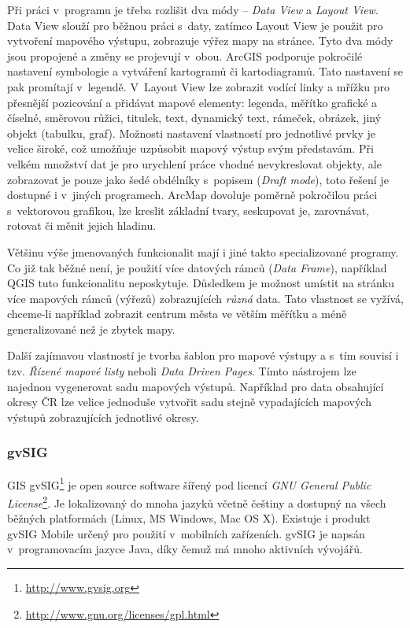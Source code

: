 \documentclass[a4paper,12pt,draft]{article}
\begin{document}
Při práci v~programu je třeba rozlišit dva módy -- \emph{Data View}
a \emph{Layout View}. Data View slouží pro běžnou práci s~daty,
zatímco Layout View je použit pro vytvoření mapového výstupu,
zobrazuje výřez mapy na stránce. Tyto dva módy jsou propojené a
změny se projevují v~obou. ArcGIS podporuje pokročilé nastavení
symbologie a vytváření kartogramů či kartodiagramů. Tato nastavení se
pak promítají v~legendě. V~Layout View lze zobrazit vodící linky a
mřížku pro přesnější pozicování  a  přidávat mapové elementy:
legenda, měřítko grafické a číselné, směrovou růžici, titulek,
text, dynamický text, rámeček, obrázek, jiný objekt (tabulku, graf).
Možnosti nastavení vlastností pro jednotlivé prvky je velice široké,
což umožňuje uzpůsobit mapový výstup svým představám. Při velkém
množství dat je pro urychlení práce vhodné nevykreslovat objekty, ale
zobrazovat je pouze jako šedé obdélníky s~popisem (\emph{Draft mode}),
toto řešení je dostupné i v~jiných programech. ArcMap dovoluje poměrně
pokročilou práci s~vektorovou grafikou, lze kreslit základní tvary,
seskupovat je, zarovnávat, rotovat či měnit jejich hladinu.

Většinu výše jmenovaných funkcionalit mají i jiné takto
specializované programy. Co již tak běžné není, je použití více
datových rámců (\emph{Data Frame}), například QGIS tuto funkcionalitu
neposkytuje. Důsledkem je možnost umístit na stránku více mapových
rámců (výřezů) zobrazujících \emph{různá} data. Tato vlastnost
se vyžívá, chceme-li například zobrazit centrum města ve větším
měřítku a méně generalizované než je zbytek mapy.

Další zajímavou vlastností je tvorba šablon pro mapové výstupy a
s~tím souvisí i tzv. \emph{Řízené mapové listy} neboli \emph{Data
Driven Pages}. Tímto nástrojem lze najednou vygenerovat sadu mapových
výstupů. Například pro data obsahující okresy ČR lze velice jednoduše
vytvořit sadu stejně vypadajících mapových výstupů zobrazujících
jednotlivé okresy.


\subsubsection{gvSIG}
GIS gvSIG\footnote{\url{http://www.gvsig.org}} je open source software šířený
pod licencí \emph{GNU General Public
License}\footnote{\url{http://www.gnu.org/licenses/gpl.html}}. Je
lokalizovaný do mnoha jazyků včetně češtiny a dostupný na všech
běžných platformách (Linux, MS Windows, Mac OS X). Existuje i produkt gvSIG
Mobile určený pro použití v~mobilních zařízeních. gvSIG je napsán
v~programovacím jazyce Java, díky čemuž má mnoho aktivních vývojářů.
\end{document}
